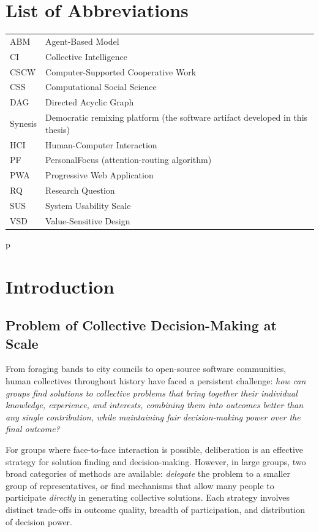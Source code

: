 \documentclass[a4paper, 12pt, twoside]{iviathesis}
\begin{document}
\chapter*{List of Abbreviations}
\begin{tabular}{@{}ll@{}}
ABM  & Agent-Based Model \\
CI   & Collective Intelligence \\
CSCW & Computer-Supported Cooperative Work \\
CSS  & Computational Social Science \\
DAG  & Directed Acyclic Graph \\
Synesis & Democratic remixing platform (the software artifact developed in this thesis) \\
HCI  & Human-Computer Interaction \\
PF   & PersonalFocus (attention-routing algorithm) \\
PWA  & Progressive Web Application \\
RQ   & Research Question \\
SUS  & System Usability Scale \\
VSD  & Value-Sensitive Design \\
\end{tabular}

\tableofcontents
p\listoffigures
\listoftables
\markboth{}{}

\mainmatter %

\chapter{Introduction}
\label{ch:introduction}

\section{Problem of Collective Decision-Making at Scale}
\label{sec:problem-statement}

From foraging bands to city councils to open-source software communities, human collectives throughout history have faced a persistent challenge: \textit{how can groups find solutions to collective problems that bring together their individual knowledge, experience, and interests, combining them into outcomes better than any single contribution, while maintaining fair decision-making power over the final outcome?} 

For groups where face-to-face interaction is possible, deliberation is an effective strategy for solution finding and decision-making. 
However, in large groups, two broad categories of methods are available: \textit{delegate} the problem to a smaller group of representatives, or find mechanisms that allow many people to participate \textit{directly} in generating collective solutions. Each strategy involves distinct trade-offs in outcome quality, breadth of participation, and distribution of decision power.
\end{document}
